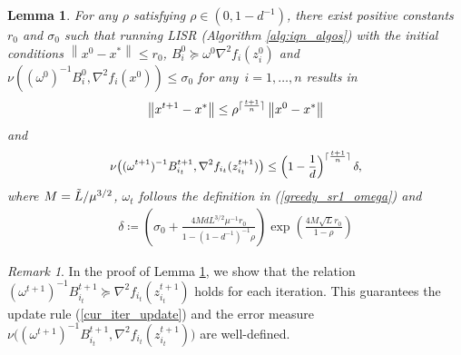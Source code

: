 \documentclass[letterpaper]{article} %
\theoremstyle{plain}
\newtheorem{lemma}[theorem]{Lemma}
\theoremstyle{definition}
\theoremstyle{remark}
\newtheorem{remark}[theorem]{Remark}
\DeclarePairedDelimiter\ceil{\lceil}{\rceil}
\newcommand\norm[1]{\left\lVert#1\right\rVert}
\begin{document}
\begin{lemma}
For any $\rho$ satisfying $\rho\in(0,1 - d^{-1})$, there exist positive constants $r_0$ and $\sigma_0$ such that running LISR (Algorithm \ref{alg:iqn_algos}) with the initial conditions $\norm{x^0-x^*} \leq r_0$, $B_i^0 \succeq \omega^0 \nabla^2 f_i(z_i^0)$ and $\nu((\omega^0)^{-1}{B_i^0}, \nabla^2 f_i (x^0)) \leq \sigma_0$ for any~$i=1,\dots,n$ results in
 \begin{equation}
        \norm{x^{t+1} - x^*} \leq \rho^{\ceil{\frac{t+1}{n}}} \norm{x^0 - x^*}
        \label{eq:linear_recur_1}
    \end{equation}
and 
    \begin{equation}\label{eq:linear_recur_2}
    \small\begin{split}   
         \nu\big((\omega^{t+1})^{-1} B_{i_t}^{t+1}, \nabla^2 f_{i_t}(z_{i_t}^{t+1})\big) \leq \left(1 - \frac{1}{d}\right)^{\ceil{\frac{t+1}{n}}} \delta,
    \end{split}
    \end{equation}
    where  $M = \Tilde{L} / \mu^{{3}/{2}}$, $\omega_t$ follows the definition in (\ref{greedy_sr1_omega}) and
    \begin{align*}
     \delta \coloneqq \left(\sigma_0 +\frac{4M d L^{{3}/{2}} \mu^{-1} r_0 }{1 - (1-d^{-1})^{-1} \rho}\right)\exp\left(\frac{4M \sqrt{L} r_0}{1 - \rho}\right)   
    \end{align*}
    \label{lemma:core_recur}
\end{lemma}
\begin{remark}
    In the proof of Lemma \ref{lemma:core_recur}, we show that the relation $(\omega^{t+1})^{-1} B_{i_t}^{t+1} \succeq \nabla^2 f_{i_t}(z_{i_t}^{t+1})$ holds for each iteration. This guarantees the update rule (\ref{cur_iter_update}) and the error measure  $\nu\big((\omega^{t+1})^{-1} B_{i_t}^{t+1}, \nabla^2 f_{i_t}(z_{i_t}^{t+1})\big)$ are well-defined.
\end{remark}
\end{document}

